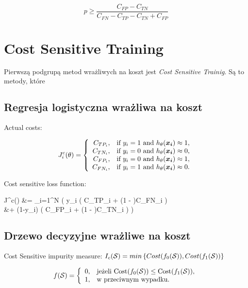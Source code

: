 \documentclass{book}
\begin{document}
	$$ p \ge \frac{C_{FP} - C_{TN}}{C_{FN} - C_{TP} - C_{TN} + C_{FP}}$$

	\section{Cost Sensitive Training}
	
		Pierwszą podgrupą metod wrażliwych na koszt jest \textit{Cost Sensitive Trainig}. Są to metody, które 
	
	\subsection{Regresja logistyczna wrażliwa na koszt}
	
	    Actual costs:
	
		$$
		J^c_i(\theta)=\left\{
		\begin{array}{rl}
		C_{TP_i}, &\mbox{if $y_i = 1$ and $h_{\theta}(\boldsymbol{x_i}) \approx 1$}, \\
		C_{TN_i}, &\mbox{if $y_i = 0$ and $h_{\theta}(\boldsymbol{x_i}) \approx 0$}, \\
		C_{FP_i}, &\mbox{if $y_i = 0$ and $h_{\theta}(\boldsymbol{x_i}) \approx 1$}, \\
		C_{FN_i}, &\mbox{if $y_i = 1$ and $h_{\theta}(\boldsymbol{x_i}) \approx 0$}.
		\end{array}
		\right.
		$$
		
		Cost sensitive loss function:
		\begin{talign*}
			J^c(\theta) &=  \sum_{i=1}^{N} \bigg( y_i \Big( \htx C_{TP_i} + (1 - \htx)C_{FN_i} \Big) \\
			&+ (1-y_i) \Big( \htx C_{FP_i} + (1 - \htx)C_{TN_i} \Big) \bigg)
		\end{talign*}
	
	\subsection{Drzewo decyzyjne wrażliwe na koszt}
	
	
	
		
		Cost Sensitive impurity measure:
		$ I_c(\mathcal{S}) = min \left\{ Cost(f_0(\mathcal{S})), Cost(f_1(\mathcal{S})) \right\}$
		
		$$ f(\mathcal{S}) =  \left\{
			\begin{array}{rl}
				0, &\mbox{jeżeli $\text{Cost}(f_0(\mathcal{S})) \leq \text{Cost}(f_1(\mathcal{S}))$}, \\
				1, &\mbox{w przeciwnym wypadku}.
			\end{array}{}
		\right.
		$$
	
	
\end{document}
